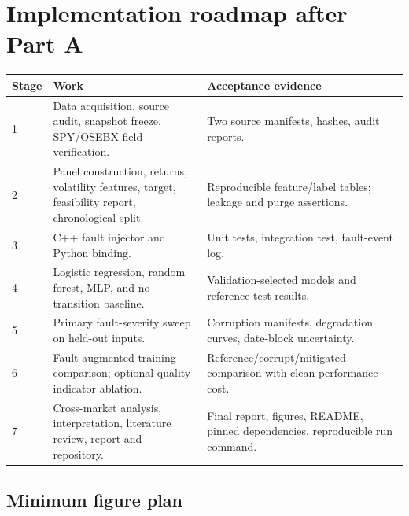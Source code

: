 \documentclass[11pt,a4paper]{article}
\begin{document}
\section{Implementation roadmap after Part A}
\label{sec:roadmap}

\begin{longtable}{p{1.5cm}p{7.1cm}p{5.0cm}}
\toprule
\textbf{Stage} & \textbf{Work} & \textbf{Acceptance evidence}\\
\midrule
1 & Data acquisition, source audit, snapshot freeze, SPY/OSEBX field verification. & Two source manifests, hashes, audit reports.\\
2 & Panel construction, returns, volatility features, target, feasibility report, chronological split. & Reproducible feature/label tables; leakage and purge assertions.\\
3 & C++ fault injector and Python binding. & Unit tests, integration test, fault-event log.\\
4 & Logistic regression, random forest, MLP, and no-transition baseline. & Validation-selected models and reference test results.\\
5 & Primary fault-severity sweep on held-out inputs. & Corruption manifests, degradation curves, date-block uncertainty.\\
6 & Fault-augmented training comparison; optional quality-indicator ablation. & Reference/corrupt/mitigated comparison with clean-performance cost.\\
7 & Cross-market analysis, interpretation, literature review, report and repository. & Final report, figures, README, pinned dependencies, reproducible run command.\\
\bottomrule
\end{longtable}

\subsection{Minimum figure plan}
\end{document}
